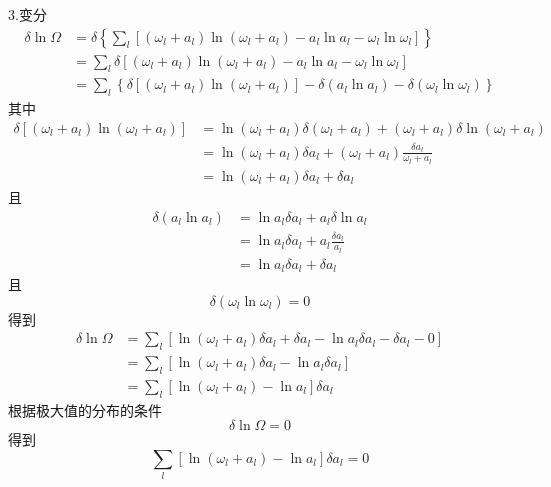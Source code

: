 3.变分
\begin{equation}
    \begin{aligned}
        \delta \ln \Omega &=\delta \left\{ \sum_l{\left[ \left( \omega _l+a_l \right) \ln \left( \omega _l+a_l \right) -a_l\ln a_l-\omega _l\ln \omega _l \right]} \right\} 
\\
&=\sum_l{\delta \left[ \left( \omega _l+a_l \right) \ln \left( \omega _l+a_l \right) -a_l\ln a_l-\omega _l\ln \omega _l \right]}
\\
&=\sum_l{\left\{ \delta \left[ \left( \omega _l+a_l \right) \ln \left( \omega _l+a_l \right) \right] -\delta \left( a_l\ln a_l \right) -\delta \left( \omega _l\ln \omega _l \right) \right\}}
    \end{aligned}
\end{equation}
其中
\begin{equation}
    \begin{aligned}
        \delta \left[ \left( \omega _l+a_l \right) \ln \left( \omega _l+a_l \right) \right] &=\ln \left( \omega _l+a_l \right) \delta \left( \omega _l+a_l \right) +\left( \omega _l+a_l \right) \delta \ln \left( \omega _l+a_l \right) 
\\
&=\ln \left( \omega _l+a_l \right) \delta a_l+\left( \omega _l+a_l \right) \frac{\delta a_l}{\omega _l+a_l}
\\
&=\ln \left( \omega _l+a_l \right) \delta a_l+\delta a_l
    \end{aligned}
\end{equation}
且
\begin{equation}
    \begin{aligned}
        \delta \left( a_l\ln a_l \right) &=\ln a_l\delta a_l+a_l\delta \ln a_l
\\
&=\ln a_l\delta a_l+a_l\frac{\delta a_l}{a_l}
\\
&=\ln a_l\delta a_l+\delta a_l
    \end{aligned}
\end{equation}
且
\begin{equation}
    \delta \left( \omega _l\ln \omega _l \right) =0
\end{equation}
得到
\begin{equation}
    \begin{aligned}
        \delta \ln \Omega &=\sum_l{\left[ \ln \left( \omega _l+a_l \right) \delta a_l+\delta a_l-\ln a_l\delta a_l-\delta a_l-0 \right]}
\\
&=\sum_l{\left[ \ln \left( \omega _l+a_l \right) \delta a_l-\ln a_l\delta a_l \right]}
\\
&=\sum_l{\left[ \ln \left( \omega _l+a_l \right) -\ln a_l \right] \delta a_l}
    \end{aligned}
\end{equation}
根据极大值的分布的条件
\begin{equation}
    \delta \ln \Omega =0
\end{equation}
得到
\begin{equation}
    \sum_l{\left[ \ln \left( \omega _l+a_l \right) -\ln a_l \right] \delta a_l}=0
\end{equation}

